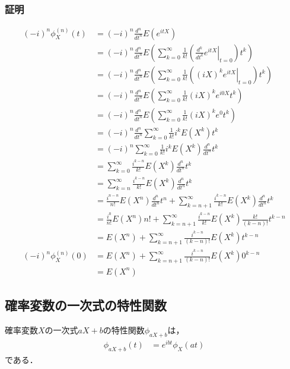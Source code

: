 \documentclass[dvipdfmx]{jsarticle}
\begin{document}
 \subsubsection{証明}
 \begin{align}
  \left(-i\right)^n\phi_X^{\left(n\right)}\left(t\right)&=\left(-i\right)^n\frac{d^n}{dt^n}E\left(e^{itX}\right)\nonumber\\
  &=\left(-i\right)^n\frac{d^n}{dt^n}E\left(\sum_{k=0}^\infty\frac{1}{k!}\left(\left.\frac{d^k}{dt^k}e^{itX}\right|_{t=0}\right)t^k\right)\nonumber\\
  &=\left(-i\right)^n\frac{d^n}{dt^n}E\left(\sum_{k=0}^\infty\frac{1}{k!}\left(\left.\left(iX\right)^ke^{itX}\right|_{t=0}\right)t^k\right)\nonumber\\
  &=\left(-i\right)^n\frac{d^n}{dt^n}E\left(\sum_{k=0}^\infty\frac{1}{k!}\left(iX\right)^ke^{i0X}t^k\right)\nonumber\\
  &=\left(-i\right)^n\frac{d^n}{dt^n}E\left(\sum_{k=0}^\infty\frac{1}{k!}\left(iX\right)^ke^0t^k\right)\nonumber\\
  &=\left(-i\right)^n\frac{d^n}{dt^n}\sum_{k=0}^\infty\frac{1}{k!}i^kE\left(X^k\right)t^k\nonumber\\
  &=\left(-i\right)^n\sum_{k=0}^\infty\frac{1}{k!}i^kE\left(X^k\right)\frac{d^n}{dt^n}t^k\nonumber\\
  &=\sum_{k=0}^\infty\frac{i^{k-n}}{k!}E\left(X^k\right)\frac{d^n}{dt^n}t^k\nonumber\\
  &=\sum_{k=n}^\infty\frac{i^{k-n}}{k!}E\left(X^k\right)\frac{d^n}{dt^n}t^k\nonumber\\
  &=\frac{i^{n-n}}{n!}E\left(X^n\right)\frac{d^n}{dt^n}t^n+\sum_{k=n+1}^\infty\frac{i^{k-n}}{k!}E\left(X^k\right)\frac{d^n}{dt^n}t^k\nonumber\\
  &=\frac{i^0}{n!}E\left(X^n\right)n!+\sum_{k=n+1}^\infty\frac{i^{k-n}}{k!}E\left(X^k\right)\frac{k!}{\left(k-n\right)!}t^{k-n}\nonumber\\
  &=E\left(X^n\right)+\sum_{k=n+1}^\infty\frac{i^{k-n}}{\left(k-n\right)!}E\left(X^k\right)t^{k-n}\nonumber\\
  \left(-i\right)^n\phi_X^{\left(n\right)}\left(0\right)&=E\left(X^n\right)+\sum_{k=n+1}^\infty\frac{i^{k-n}}{\left(k-n\right)!}E\left(X^k\right)0^{k-n}\nonumber\\
  &=E\left(X^n\right)
 \end{align}
 \subsection{確率変数の一次式の特性関数}
確率変数$X$の一次式$aX+b$の特性関数$\phi_{aX+b}$は，
 \begin{align}
  \phi_{aX+b}\left(t\right)&=e^{ibt}\phi_{X}\left(at\right)
 \end{align}
である．
\end{document}
